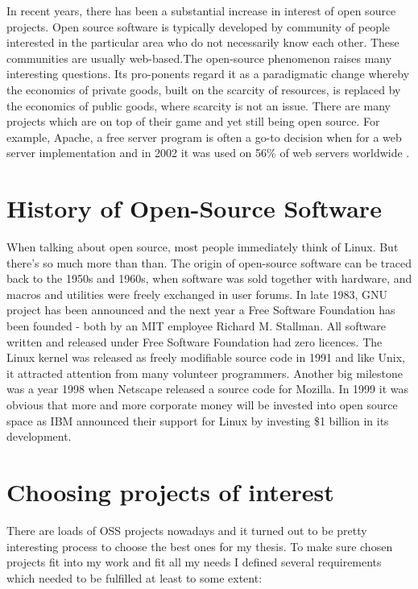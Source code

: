 In recent years, there has been a substantial increase in interest of open source projects. Open source software is typically developed by community of people interested in the particular area who do not necessarily know each other. These communities are usually web-based.The open-source phenomenon raises many interesting questions. Its pro-ponents regard it as a paradigmatic change whereby the economics of private goods, built on the scarcity of resources, is replaced by the economics of public goods, where scarcity is not an issue. \cite{alexander2002working} There are many projects which are on top of their game and yet still being open source. For example, Apache, a free server program is often a go-to decision when for a web server implementation and in 2002 it was used on 56\% of web servers worldwide \cite{lerner2001open}.

\section{History of Open-Source Software}
When talking about open source, most people immediately think of Linux. But there's so much more than than. The origin of open-source software can be traced back to the 1950s and 1960s, when software was sold together with hardware, and macros and utilities were freely exchanged in user forums. \cite{alexander2002working} In late 1983, GNU project has been announced and the next year a Free Software Foundation has been founded - both by an MIT employee Richard M. Stallman. All software written and released under Free Software Foundation had zero licences. The Linux kernel was released as freely modifiable source code in 1991 and like Unix, it attracted attention from many volunteer programmers. Another big milestone was a year 1998 when Netscape released a source code for Mozilla. In 1999 it was obvious that more and more corporate money will be invested into open source space as IBM announced their support for Linux by investing \$1 billion in its development.

\section{Choosing projects of interest}
There are loads of OSS projects nowadays and it turned out to be pretty interesting process to choose the best ones for my thesis. To make sure chosen projects fit into my work and fit  all my needs I defined several requirements which needed to be fulfilled at least to some extent:

